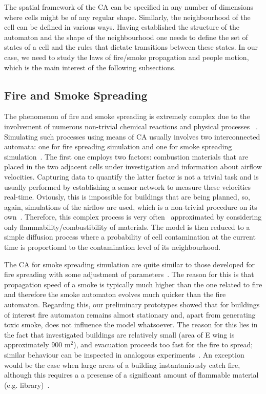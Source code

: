 The spatial framework of the CA can be specified in any number of dimensions
where cells might be of any regular shape.
Similarly, the neighbourhood of the cell can be defined in various ways.
Having established the structure of the automaton and the shape of the
neighbourhood one needs to define the set of states of a cell and the rules
that dictate transitions between these states.
In our case, we need to study the laws of fire/smoke propagation and people
motion, which is the main interest of the following subsections.

\subsection{Fire and Smoke Spreading}
The phenomenon of fire and smoke spreading is extremely complex due to the
involvement of numerous non-trivial chemical reactions and physical processes
~\cite{Ying, Curiac}.
Simulating such processes using means of CA usually involves two interconnected
automata: one for fire spreading simulation and one for smoke spreading
simulation~\cite{Curiac}.
The first one employs two factors: combustion materials that are placed in the
two adjacent cells under investigation and information about airflow velocities.
Capturing data to quantify the latter factor is not a trivial task and is
usually performed by establishing a sensor network to measure these velocities
real-time.
Oviously, this is impossible for buildings that are being planned, so, again,
simulations of the airflow are used, which is a non-trivial procedure on its
own~\cite{Airflow}.
Therefore, this complex process is very often~\cite{Tissera1, Tissera2}
approximated by considering only flammability/combustibility of materials.
The model is then reduced to a simple diffusion process where a probability of
cell contamination at the current time is proportional to the contamination
level of its neighbourhood.

The CA for smoke spreading simulation are quite similar to those developed for
fire spreading with some adjustment of parameters~\cite{Curiac}.
The reason for this is that propagation speed of a smoke is typically much
higher than the one related to fire and therefore the smoke automaton evolves
much quicker than the fire automaton.
Regarding this, our preliminary prototypes showed that for buildings of
interest fire automaton remains almost stationary and, apart from generating
toxic smoke, does not influence the model whatsoever.
The reason for this lies in the fact that investigated buildings are relatively
small (area of E wing is approximately 900 m$^2$), and evacuation proceeds too
fast for the fire to spread; similar behaviour can be inspected in analogous
experiments~\cite{Tissera1}.
An exception would be the case when large areas of a building instantaniously
catch fire, although this requires a a presense of a significant amount of
flammable material (e.g. library)~\cite{Tissera2}.

